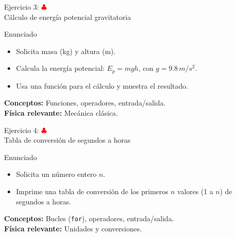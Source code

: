 \documentclass[10pt]{beamer}
\begin{document}

\begin{frame}{Ejercicio 3: \hfill \textcolor{red}{$\clubsuit$} \\ Cálculo de energía potencial gravitatoria}
  \begin{block}{Enunciado}
    \begin{itemize}
      \item Solicita masa (kg) y altura (m).
      \item Calcula la energía potencial: \(E_p = mgh\), con \(g = 9.8\,m/s^2\).
      \item Usa una función para el cálculo y muestra el resultado.
    \end{itemize}
  \end{block}
  \textbf{Conceptos:} Funciones, operadores, entrada/salida.\\
  \textbf{Física relevante:} Mecánica clásica.
\end{frame}

\begin{frame}{Ejercicio 4: \hfill \textcolor{red}{$\clubsuit$} \\ Tabla de conversión de segundos a horas}
  \begin{block}{Enunciado}
    \begin{itemize}
      \item Solicita un número entero \(n\).
      \item Imprime una tabla de conversión de los primeros \(n\) valores (1 a \(n\)) de segundos a horas.
    \end{itemize}
  \end{block}
  \textbf{Conceptos:} Bucles (\texttt{for}), operadores, entrada/salida.\\
  \textbf{Física relevante:} Unidades y conversiones.
\end{frame}
\end{document}
